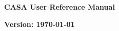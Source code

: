 \pagestyle{empty}

\Huge
\begin{center}
{\bf CASA User Reference Manual}

\end{center}
\normalsize

\begin{figure}[h!]
\begin{center}
\end{center}
\end{figure}

\begin{figure}[h!]
\begin{center}
\end{center}
\end{figure}

\Large
\begin{center}
{\bf Version: \today}
\end{center}
\normalsize

\pagebreak
